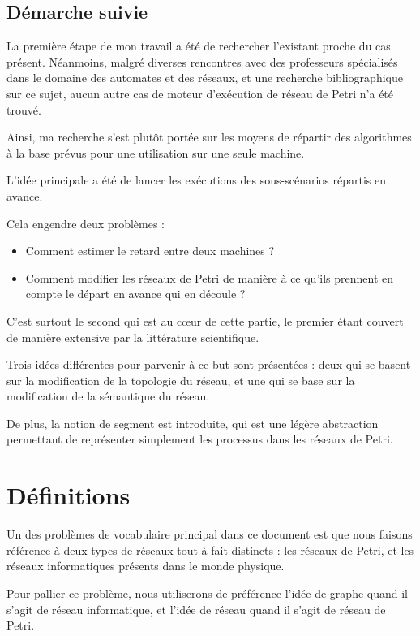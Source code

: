 \subsection{Démarche suivie}
La première étape de mon travail a été de rechercher l'existant proche du cas présent. Néanmoins, malgré diverses rencontres avec des professeurs spécialisés dans le domaine des automates et des réseaux, et une recherche bibliographique sur ce sujet, aucun autre cas de moteur d'exécution de réseau de Petri n'a été trouvé.

Ainsi, ma recherche s'est plutôt portée sur les moyens de répartir des algorithmes à la base prévus pour une utilisation sur une seule machine. 

L'idée principale a été de lancer les exécutions des sous-scénarios répartis en avance.

Cela engendre deux problèmes : 
\begin{itemize}
\item Comment estimer le retard entre deux machines ?
\item Comment modifier les réseaux de Petri de manière à ce qu'ils prennent en compte le départ en avance qui en découle ?
\end{itemize}

C'est surtout le second qui est au cœur de cette partie, le premier étant couvert de manière extensive par la littérature scientifique.

Trois idées différentes pour parvenir à ce but sont présentées : deux qui se basent sur la modification de la topologie du réseau, et une qui se base sur la modification de la sémantique du réseau.

De plus, la notion de segment est introduite, qui est une légère abstraction permettant de représenter simplement les processus dans les réseaux de Petri.

\section{Définitions}
Un des problèmes de vocabulaire principal dans ce document est que nous faisons référence à deux types de réseaux tout à fait distincts : les réseaux de Petri, et les réseaux informatiques présents dans le monde physique.

Pour pallier ce problème, nous utiliserons de préférence l'idée de graphe quand il s'agit de réseau informatique, et l'idée de réseau quand il s'agit de réseau de Petri.

